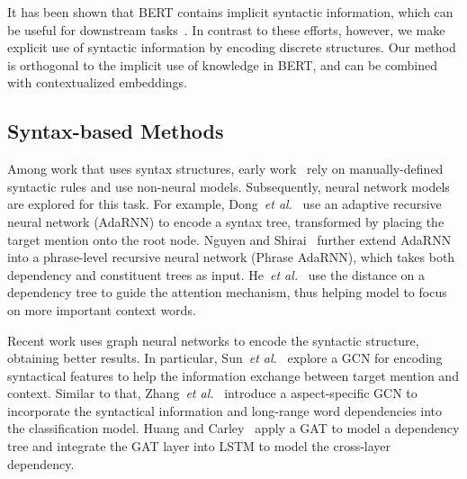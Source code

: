 \documentclass[journal]{IEEEtran}
\begin{document}
	It has been shown that BERT contains implicit syntactic information, which can be useful for downstream tasks~\cite{Goldberg2019AssessingBS,clark2019what}. In contrast to these efforts, however, we make explicit use of syntactic information by encoding discrete structures. Our method is orthogonal to the implicit use of knowledge in BERT, and can be combined with contextualized embeddings.
	
	\subsection{Syntax-based Methods}
	Among work that uses syntax structures, early work~\cite{Qiu2011OpinionWE,Liu2013OpinionTE} rely on manually-defined syntactic rules and use non-neural models.
	Subsequently, neural network models are explored for this task.
	For example, 
	Dong~\textit{et al.}~\cite{dong-etal-2014-adaptive} use an adaptive recursive neural network (AdaRNN) to encode a syntax tree, transformed by placing the target mention onto the root node. 
	Nguyen and Shirai~\cite{Nguyen2015PhraseRNNPR} further extend AdaRNN into a phrase-level recursive neural network (Phrase AdaRNN), which takes both dependency and constituent trees as input.
	He~\textit{et al.}~\cite{he-etal-2018-effective} use the distance on a dependency tree to guide the attention mechanism, thus helping model to focus on more important context words.
	
	Recent work uses graph neural networks to encode the syntactic structure, obtaining better results. 
	In particular, Sun~\textit{et al.}~\cite{sun-etal-2019-aspect} explore a GCN for encoding syntactical features to help the information exchange between target mention and context. 
	Similar to that, Zhang~\textit{et al.}~\cite{zhang-etal-2019-aspect} introduce a aspect-specific GCN to incorporate the syntactical information and long-range word dependencies into the classification model.
	Huang and Carley~\cite{huang-carley-2019-syntax} apply a GAT to model a dependency tree and integrate the GAT layer into LSTM to model the cross-layer dependency.
\end{document}
